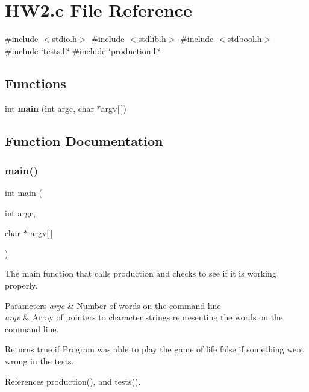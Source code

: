 \section{H\+W2.\+c File Reference}
\label{HW2_8c}
{\ttfamily \#include $<$stdio.\+h$>$}\newline
{\ttfamily \#include $<$stdlib.\+h$>$}\newline
{\ttfamily \#include $<$stdbool.\+h$>$}\newline
{\ttfamily \#include \char`\"{}tests.\+h\char`\"{}}\newline
{\ttfamily \#include \char`\"{}production.\+h\char`\"{}}\newline
\subsection*{Functions}
\begin{DoxyCompactItemize}
\item 
int \textbf{ main} (int argc, char $\ast$argv[$\,$])
\end{DoxyCompactItemize}


\subsection{Function Documentation}
\mbox{\label{HW2_8c_a0ddf1224851353fc92bfbff6f499fa97}} 
\subsubsection{main()}
{\footnotesize\ttfamily int main (\begin{DoxyParamCaption}\item[{int}]{argc,  }\item[{char $\ast$}]{argv[$\,$] }\end{DoxyParamCaption})}

The main function that calls production and checks to see if it is working properly.


\begin{DoxyParams}{Parameters}
{\em argc} & Number of words on the command line \\
\hline
{\em argv} & Array of pointers to character strings representing the words on the command line. \\
\hline
\end{DoxyParams}
\begin{DoxyReturn}{Returns}
true if Program was able to play the game of life false if something went wrong in the tests. 
\end{DoxyReturn}


References production(), and tests().

